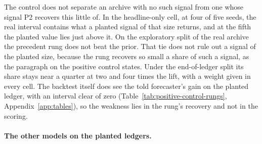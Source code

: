 The control does not separate an archive with no such signal from one whose signal P2 recovers this little of. In the headline-only cell, at four of five seeds, the real interval contains what a planted signal of that size returns, and at the fifth the planted value lies just above it. On the exploratory split of the real archive the precedent rung does not beat the prior. That tie does not rule out a signal of the planted size, because the rung recovers so small a share of such a signal, as the paragraph on the positive control states. Under the end-of-ledger split its share stays near a quarter at two and four times the lift, with a weight given in every cell. The backtest itself does see the told forecaster's gain on the planted ledger, with an interval clear of zero (Table~\ref{tab:positive-control-rungs}, Appendix~\ref{app:tables}), so the weakness lies in the rung's recovery and not in the scoring.

\iftmlr\paragraph{The other models on the planted ledgers.}\fi
\label{sec:control-rungs}
\begin{table}[t]\centering\scriptsize
\caption{Models on the ledger with the planted signal, at both sizes and under the rolling backtest, in pooled form except where a row names the headline-only cell. A Brier difference that is negative favours the model, and so does a log score difference that is positive.}
\label{tab:fmt-control-rungs}
\resizebox{\columnwidth}{!}{}
\end{table}

